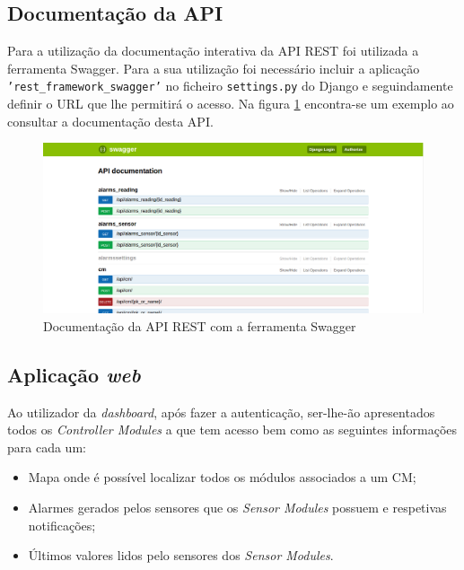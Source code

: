 \subsection{Documentação da API}

Para a utilização da documentação interativa da API REST foi utilizada a ferramenta Swagger. Para a sua utilização foi necessário incluir a aplicação \texttt{'rest\_framework\_swagger'} no ficheiro \texttt{settings.py} do Django e seguindamente definir o \ac{URL} que lhe permitirá o acesso. Na figura \ref{docapi} encontra-se um exemplo ao consultar a documentação desta API. 

\newpage

\begin{figure}[h]
	\centering
	\includegraphics[width=0.91\linewidth]{prints-web/api-doc.png}
	\caption{Documentação da API REST com a ferramenta Swagger}
	\label{docapi}
\end{figure}


\subsection{Aplicação \textit{web}}

Ao utilizador da \textit{dashboard}, após fazer a autenticação, ser-lhe-ão apresentados todos os \textit{Controller Modules} a que tem acesso bem como as seguintes informações para cada um:


\begin{itemize}
	\item Mapa onde é possível localizar todos os módulos associados a um \acl{CM}; 
	
	\item Alarmes gerados pelos sensores que os \textit{Sensor Modules} possuem e respetivas notificações; 
	
	\item Últimos valores lidos pelo sensores dos \textit{Sensor Modules}.
\end{itemize} 



